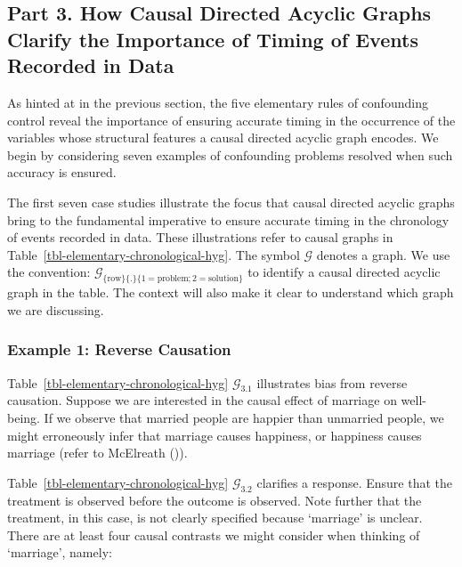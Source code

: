 \documentclass[
  single column]{article}
\begin{document}
\subsection{Part 3. How Causal Directed Acyclic Graphs Clarify the
Importance of Timing of Events Recorded in Data}\label{id-sec-3}

\begin{table}

\caption{\label{tbl-elementary-chronological-hyg}}

\centering{

\captionsetup{labelsep=none}

\terminologychronologicalhygeine

}

\end{table}%

As hinted at in the previous section, the five elementary rules of
confounding control reveal the importance of ensuring accurate timing in
the occurrence of the variables whose structural features a causal
directed acyclic graph encodes. We begin by considering seven examples
of confounding problems resolved when such accuracy is ensured.

The first seven case studies illustrate the focus that causal directed
acyclic graphs bring to the fundamental imperative to ensure accurate
timing in the chronology of events recorded in data. These illustrations
refer to causal graphs in Table~\ref{tbl-elementary-chronological-hyg}.
The symbol \(\mathcal{G}\) denotes a graph. We use the convention:
\(\mathcal{G}_{\{\text{row}\}\{.\}\{1 = \text{problem}; 2 = \text{solution}\}}\)
to identify a causal directed acyclic graph in the table. The context
will also make it clear to understand which graph we are discussing.

\subsubsection{Example 1: Reverse
Causation}\label{example-1-reverse-causation}

Table~\ref{tbl-elementary-chronological-hyg} \(\mathcal{G}_{3.1}\)
illustrates bias from reverse causation. Suppose we are interested in
the causal effect of marriage on well-being. If we observe that married
people are happier than unmarried people, we might erroneously infer
that marriage causes happiness, or happiness causes marriage (refer to
McElreath ()).

Table~\ref{tbl-elementary-chronological-hyg} \(\mathcal{G}_{3.2}\)
clarifies a response. Ensure that the treatment is observed before the
outcome is observed. Note further that the treatment, in this case, is
not clearly specified because `marriage' is unclear. There are at least
four causal contrasts we might consider when thinking of `marriage',
namely:
\end{document}
